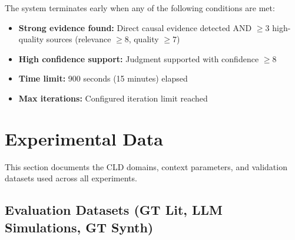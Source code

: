 The system terminates early when any of the following conditions are met:
\begin{itemize}[noitemsep]
    \item \textbf{Strong evidence found:} Direct causal evidence detected AND $\geq$3 high-quality sources (relevance $\geq 8$, quality $\geq 7$)
    \item \textbf{High confidence support:} Judgment supported with confidence $\geq 8$
    \item \textbf{Time limit:} 900 seconds (15 minutes) elapsed
    \item \textbf{Max iterations:} Configured iteration limit reached
\end{itemize}

\section{Experimental Data}
\label{sec:experimental_data}

This section documents the CLD domains, context parameters, and validation datasets used across all experiments.

\subsection{Evaluation Datasets (GT Lit, LLM Simulations, GT Synth)}
\label{sec:evaluation_datasets}

